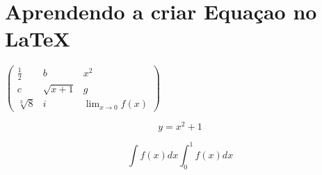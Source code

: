 \documentclass[12pt,a4]{article}
\begin{document}
\headcm \todayr
\section{Aprendendo a criar Equaçao no \LaTeX}
\vspace{2cm}
\begin{center}

$ 
\left(\begin{array}{ccc}
   \frac{1}{2} & b & x^2\\
   c  & \sqrt{x+1} & g\\
   \sqrt[3]{8}  & i & \displaystyle\lim_{x\rightarrow 0}f(x)
\end{array}\right)
$
\end{center}

\begin{equation}
    y=x^2+1
\end{equation}

\begin{equation}
    \int f(x)dx
    \displaystyle\int_0^1 f(x)dx
\end{equation}
\end{document}
